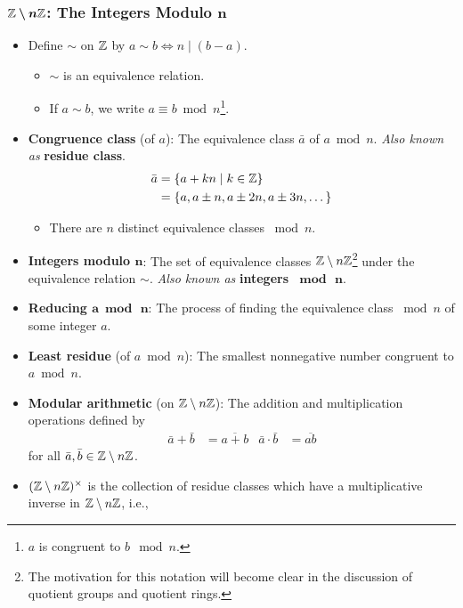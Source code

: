 \documentclass[../main.tex]{subfiles}
\begin{document}
\subsubsection{$\bm{\mathbb{Z}\setminus n\mathbb{Z}}$: The Integers Modulo $\bm{n}$}
\begin{itemize}
    \item Define $\sim$ on $\mathbb{Z}$ by $a\sim b\Longleftrightarrow n\mid(b-a)$.
    \begin{itemize}
        \item $\sim$ is an equivalence relation.
        \item If $a\sim b$, we write $a\equiv b\bmod n$\footnote{$a$ is congruent to $b\mod n$.}.
    \end{itemize}
    \item \textbf{Congruence class} (of $a$): The equivalence class $\bar{a}$ of $a\bmod n$. \emph{Also known as} \textbf{residue class}.
    \begin{align*}
        \bar{a} &= \{a+kn\mid k\in\mathbb{Z}\}\\
        &= \{a,a\pm n,a\pm 2n,a\pm 3n,\dots\}
    \end{align*}
    \begin{itemize}
        \item There are $n$ distinct equivalence classes $\bmod n$.
    \end{itemize}
    \item \textbf{Integers modulo $\bm{n}$}: The set of equivalence classes $\mathbb{Z}\setminus n\mathbb{Z}$\footnote{The motivation for this notation will become clear in the discussion of quotient groups and quotient rings.} under the equivalence relation $\sim$. \emph{Also known as} \textbf{integers $\bm{\bmod\, n}$}.
    \item \textbf{Reducing $\bm{a\bmod\, n}$}: The process of finding the equivalence class $\bmod n$ of some integer $a$.
    \item \textbf{Least residue} (of $a\bmod n$): The smallest nonnegative number congruent to $a\bmod n$.
    \item \textbf{Modular arithmetic} (on $\mathbb{Z}\setminus n\mathbb{Z}$): The addition and multiplication operations defined by
    \begin{align*}
        \bar{a}+\bar{b} &= \overline{a+b}&
        \bar{a}\cdot\bar{b} &= \overline{ab}
    \end{align*}
    for all $\bar{a},\bar{b}\in\mathbb{Z}\setminus n\mathbb{Z}$.
    \item $(\mathbb{Z}\setminus n\mathbb{Z})^\times$ is the collection of residue classes which have a multiplicative inverse in $\mathbb{Z}\setminus n\mathbb{Z}$, i.e.,

\end{itemize}
\end{document}
